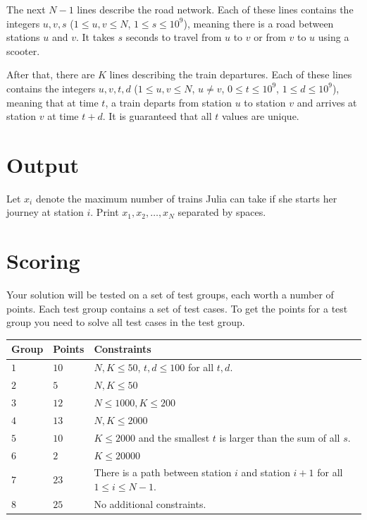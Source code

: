 The next $N-1$ lines describe the road network. Each of these lines contains the integers
$u, v, s$ ($1 \leq u, v \leq N$, $1 \leq s \leq 10^9$), meaning there is a road between stations
$u$ and $v$. It takes $s$ seconds to travel from $u$ to $v$ or from $v$ to $u$ using a scooter.

After that, there are $K$ lines describing the train departures. Each of these lines contains
the integers $u, v, t, d$ ($1 \leq u, v \leq N$, $u \neq v$, $0 \leq t \leq 10^9$, $1 \leq d \leq 10^9$), meaning
that at time $t$, a train departs from station $u$ to station $v$ and arrives at station $v$ at
time $t+d$. It is guaranteed that all $t$ values are unique.

\section*{Output}
Let $x_i$ denote the maximum number of trains Julia can take if she starts her journey at station $i$.
Print $x_1, x_2, \dots, x_N$ separated by spaces.

\section*{Scoring}
Your solution will be tested on a set of test groups, each worth a number of points. Each test group contains
a set of test cases. To get the points for a test group you need to solve all test cases in the test group.

\noindent
\begin{tabular}{| l | l | p{12cm} |}
  \hline
  \textbf{Group} & \textbf{Points} & \textbf{Constraints} \\ \hline
  $1$    & $10$       & $N, K \leq 50$, $t, d \leq 100$ for all $t,d$. \\ \hline
  $2$    & $5$        & $N, K \leq 50$ \\ \hline
  $3$    & $12$       & $N \leq 1000, K \leq 200$ \\ \hline
  $4$    & $13$       & $N, K \leq 2000$ \\ \hline
  $5$    & $10$       & $K \leq 2000$ and the smallest $t$ is larger than the sum of all $s$. \\ \hline
  $6$    & $2$        & $K \leq 20000$ \\ \hline
  $7$    & $23$       & There is a path between station $i$ and station $i+1$ for all $1 \leq i \leq N-1$. \\ \hline
  $8$    & $25$       & No additional constraints. \\ \hline
\end{tabular}

